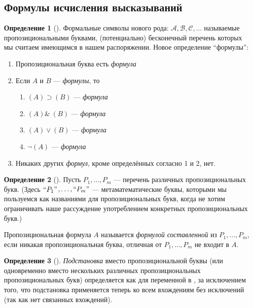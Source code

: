\documentclass[a4paper, 12pt]{article}  %
\DeclareMathOperator{\conj}{\mathbb{\&}}
\theoremstyle{definition}
\newtheorem*{definition}{Определение}
\begin{document}
	\subsection*{Формулы исчисления высказываний}
	
	\begin{definition}[]
		Формальные символы нового рода: $\mathscr{A}, \mathscr{B}, \mathscr{C}, \dots$ называемые
		пропозициональными буквами, (потенциально) бесконечный перечень которых мы считаем
		имеющимся в нашем распоряжении. Новое определение ``формулы'': 
		\begin{enumerate}
			\setlength\itemsep{-3pt}	
			\item Пропозициональная буква есть \textit{формула}
			\item Если $A$ и $B$ --- \textit{формулы}, то
			\begin{multicols}{3}
				\begin{enumerate}
					\item $(A) \supset (B)$ --- \textit{формула}
					\item $(A) \conj\: (B)$ --- \textit{формула}
					\item $(A) \vee (B)$    --- \textit{формула}
					\item $\neg (A)$        --- \textit{формула}
				\end{enumerate}
			\end{multicols}
			\item Никаких других \textit{формул}, кроме определённых согласно 1 и 2, нет.
		\end{enumerate}
	\end{definition}

	\begin{definition}[]
		Пусть $P_1, \dots, P_m$ --- перечень различных пропозициональных букв. (Здесь 
		$``P_1"$$ , \dots, ``P_m"$ --- метаматематические буквы, которыми мы пользуемся как
		названиями для пропозициональных букв, когда не хотим ограничивать наше рассуждение
		употреблением конкретных пропозициональных букв.)
		
		Пропозициональная формула $A$ называется \textit{формулой составленной} из 
		$P_1, \dots, P_m$, если никакая пропозициональная буква, отличная от $P_1, \dots, P_m$ 
		не входит в $A$.
	\end{definition}

	\begin{definition}[]
		\textit{Подстановка} вместо пропозициональной буквы (или одновременно вместо нескольких различных пропозициональных пропозициональных букв) определяется как для переменной в , за исключением того, что подстановка применяется теперь ко всем вхождениям без исключений (так как нет связанных вхождений).
	\end{definition}
\end{document}

